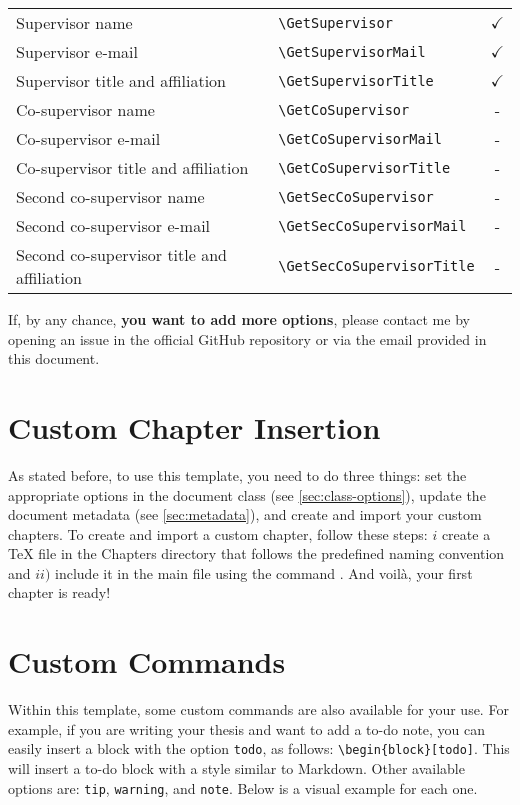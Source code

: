 \begin{longtable}[c]{llc}
Supervisor name                  & \verb|\GetSupervisor|        & $\checkmark$ \\
Supervisor e-mail                & \verb|\GetSupervisorMail|    & $\checkmark$ \\
Supervisor title and affiliation & \verb|\GetSupervisorTitle|   & $\checkmark$ \\ 

Co-supervisor name                  & \verb|\GetCoSupervisor|       & - \\
Co-supervisor e-mail                & \verb|\GetCoSupervisorMail|   & - \\
Co-supervisor title and affiliation & \verb|\GetCoSupervisorTitle|  & - \\ 

Second co-supervisor name                   & \verb|\GetSecCoSupervisor|      & - \\
Second co-supervisor e-mail                 & \verb|\GetSecCoSupervisorMail|  & - \\
Second co-supervisor title and affiliation  & \verb|\GetSecCoSupervisorTitle| & - \\
\end{longtable}

If, by any chance, \textbf{you want to add more options}, please contact me by opening an issue in the official GitHub repository or via the email provided in this document.

\section{Custom Chapter Insertion}
As stated before, to use this template, you need to do three things: set the appropriate options in the document class (see \autoref{sec:class-options}), update the document metadata (see \autoref{sec:metadata}), and create and import your custom chapters. To create and import a custom chapter, follow these steps: \(i\) create a TeX file in the Chapters directory that follows the predefined naming convention and \(ii)\) include it in the main file using the command \verb||. And voilà, your first chapter is ready!

\section{Custom Commands}
Within this template, some custom commands are also available for your use. For example, if you are writing your thesis and want to add a to-do note, you can easily insert a block with the option \verb|todo|, as follows: \verb|\begin{block}[todo]|. This will insert a to-do block with a style similar to Markdown. Other available options are: \verb|tip|, \verb|warning|, and \verb|note|. Below is a visual example for each one.

